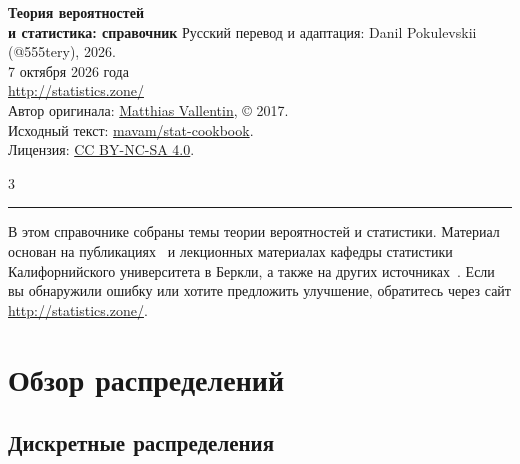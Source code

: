 \documentclass[landscape]{article}
\def\web{\url{http://statistics.zone/}}
\begin{document}
\thispagestyle{empty}
\begin{center}
  \vspace*{\fill}
  \textbf{\Huge Теория вероятностей\\[2ex] \huge и статистика: справочник}
  \vfill
  \footnotesize{
    Русский перевод и адаптация: Danil Pokulevskii (@555tery), 2026.\\[1ex]
    7 октября 2026 года\\[1ex]
    \web\\[1ex]
    Автор оригинала: \href{http://matthias.vallentin.net}{Matthias Vallentin}, © 2017.\\
    Исходный текст: \href{https://github.com/mavam/stat-cookbook}{mavam/stat-cookbook}.\\[1ex]
    Лицензия: \href{https://creativecommons.org/licenses/by-nc-sa/4.0/}{CC BY-NC-SA 4.0}.\\
  }
\end{center}

\newpage

\thispagestyle{empty}
\begin{multicols*}{3}
  \tableofcontents
  \vfill
  \hrule
  \vspace{5pt}
  {\footnotesize В этом справочнике собраны темы теории вероятностей и
  статистики. Материал основан на публикациях~\cite{Hoel72,Wasserman03,Shumway06}
  и лекционных материалах кафедры статистики Калифорнийского университета в
  Беркли, а также на других источниках~\cite{Steger01,Steger02}. Если вы
  обнаружили ошибку или хотите предложить улучшение, обратитесь через сайт
  \web.}
\end{multicols*}

\newpage

\section{Обзор распределений}

\subsection{Дискретные распределения}
\end{document}
